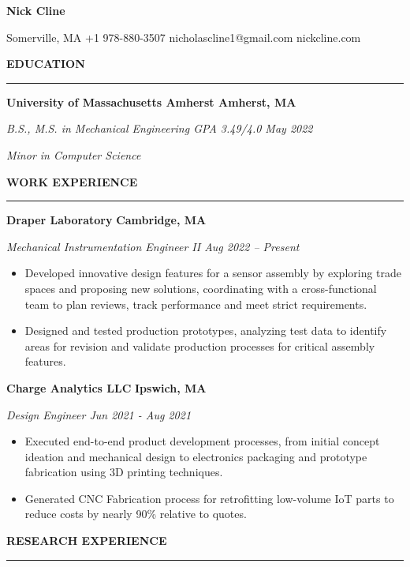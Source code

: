 \documentclass[11pt]{article}
\author{}
\date{}
\newcommand{\sectionheading}[1]{%
  \vspace{1em}%
  {\large\textbf{\MakeUppercase{#1}}}\\[-0.5em]%
  \rule{\textwidth}{0.5pt}%
  \vspace{0.5em}%
}
\begin{document}
{\centering
\huge\textbf{Nick Cline}
\par}

\vspace{0.5em}  %

{\centering
\small
Somerville, MA \textbar{} +1 978-880-3507 \textbar{}
nicholascline1@gmail.com \textbar{} nickcline.com
\par}

\sectionheading{Education}

\textbf{University of Massachusetts Amherst Amherst, MA}

\emph{B.S., M.S. in Mechanical Engineering \textbar{} GPA 3.49/4.0 May
2022}

\emph{Minor in Computer Science}

\sectionheading{Work Experience}

\textbf{Draper Laboratory} \textbf{Cambridge, MA}

\emph{Mechanical Instrumentation Engineer II Aug 2022 -- Present}

\begin{itemize}
\item
  Developed innovative design features for a sensor assembly by
  exploring trade spaces and proposing new solutions, coordinating with
  a cross-functional team to plan reviews, track performance and meet
  strict requirements.
\item
  Designed and tested production prototypes, analyzing test data to
  identify areas for revision and validate production processes for
  critical assembly features.
\end{itemize}

\textbf{Charge Analytics LLC} \textbf{Ipswich, MA}

\emph{Design Engineer Jun 2021 - Aug 2021}

\begin{itemize}
\item
  Executed end-to-end product development processes, from initial
  concept ideation and mechanical design to electronics packaging and
  prototype fabrication using 3D printing techniques.
\item
  Generated CNC Fabrication process for retrofitting low-volume IoT
  parts to reduce costs by nearly 90\% relative to quotes.
\end{itemize}

\sectionheading{Research Experience}
\end{document}

